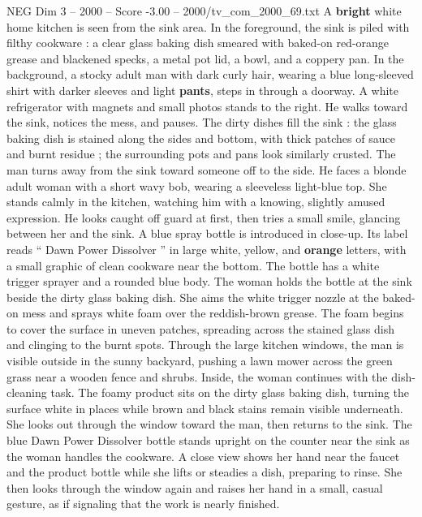 \begin{textsample}{NEG Dim 3 – 2000 – Score -3.00 – 2000/tv\_com\_2000\_69.txt}  \label{ex:f3_neg_035}
A \textbf{bright} white home kitchen is seen from the sink area.
In the foreground, the sink is piled with filthy cookware : a clear glass baking dish smeared with baked-on red-orange grease and blackened specks, a metal pot lid, a bowl, and a coppery pan.
In the background, a stocky adult man with dark curly hair, wearing a blue long-sleeved shirt with darker sleeves and light \textbf{pants}, steps in through a doorway.
A white refrigerator with magnets and small photos stands to the right.
He walks toward the sink, notices the mess, and pauses.
The dirty dishes fill the sink : the glass baking dish is stained along the sides and bottom, with thick patches of sauce and burnt residue ; the surrounding pots and pans look similarly crusted.
The man turns away from the sink toward someone off to the side.
He faces a blonde adult woman with a short wavy bob, wearing a sleeveless light-blue top.
She stands calmly in the kitchen, watching him with a knowing, slightly amused expression.
He looks caught off guard at first, then tries a small smile, glancing between her and the sink.
A blue spray bottle is introduced in close-up.
Its label reads “ Dawn Power Dissolver ” in large white, yellow, and \textbf{orange} letters, with a small graphic of clean cookware near the bottom.
The bottle has a white trigger sprayer and a rounded blue body.
The woman holds the bottle at the sink beside the dirty glass baking dish.
She aims the white trigger nozzle at the baked-on mess and sprays white foam over the reddish-brown grease.
The foam begins to cover the surface in uneven patches, spreading across the stained glass dish and clinging to the burnt spots.
Through the large kitchen windows, the man is visible outside in the sunny backyard, pushing a lawn mower across the green grass near a wooden fence and shrubs.
Inside, the woman continues with the dish-cleaning task.
The foamy product sits on the dirty glass baking dish, turning the surface white in places while brown and black stains remain visible underneath.
She looks out through the window toward the man, then returns to the sink.
The blue Dawn Power Dissolver bottle stands upright on the counter near the sink as the woman handles the cookware.
A close view shows her hand near the faucet and the product bottle while she lifts or steadies a dish, preparing to rinse.
She then looks through the window again and raises her hand in a small, casual gesture, as if signaling that the work is nearly finished.

\end{textsample}
